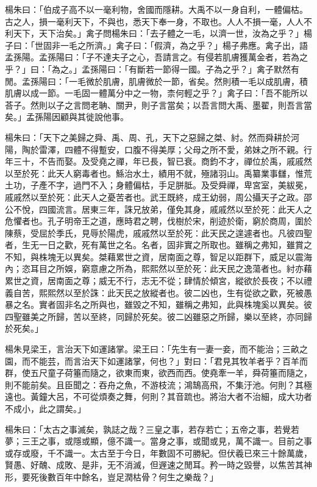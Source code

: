 \begin{pinyinscope}
楊朱曰：「伯成子高不以一毫利物，舍國而隱耕。大禹不以一身自利，一體偏枯。古之人，損一毫利天下，不與也，悉天下奉一身，不取也。人人不損一毫，人人不利天下，天下治矣。」禽子問楊朱曰：「去子體之一毛，以濟一世，汝為之乎？」楊子曰：「世固非一毛之所濟。」禽子曰：「假濟，為之乎？」楊子弗應。禽子出，語孟孫陽。孟孫陽曰：「子不達夫子之心，吾請言之。有侵若肌膚獲萬金者，若為之乎？」曰：「為之。」孟孫陽曰：「有斷若一節得一國。子為之乎？」禽子默然有閒。孟孫陽曰：「一毛微於肌膚，肌膚微於一節，省矣。然則積一毛以成肌膚，積肌膚以成一節。一毛固一體萬分中之一物，柰何輕之乎？」禽子曰：「吾不能所以荅子。然則以子之言問老聃、關尹，則子言當矣；以吾言問大禹、墨翟，則吾言當矣。」孟孫陽因顧與其徙說他事。

楊朱曰：「天下之美歸之舜、禹、周、孔，天下之惡歸之桀、紂。然而舜耕於河陽，陶於雷澤，四體不得蹔安，口腹不得美厚；父母之所不愛，弟妹之所不親。行年三十，不告而娶。及受堯之禪，年已長，智已衰。商鈞不才，禪位於禹，戚戚然以至於死：此天人窮毒者也。鯀治水土，績用不就，殛諸羽山。禹纂業事讎，惟荒土功，子產不字，過門不入；身體偏枯，手足胼胝。及受舜禪，卑宮室，美紱冕，戚戚然以至於死：此天人之憂苦者也。武王既終，成王幼弱，周公攝天子之政。邵公不悅，四國流言。居東三年，誅兄放弟，僅免其身，戚戚然以至於死：此天人之危懼者也。孔子明帝王之道，應時君之聘，伐樹於宋，削迹於衛，窮於商周，圍於陳蔡，受屈於季氏，見辱於陽虎，戚戚然以至於死：此天民之遑遽者也。凡彼四聖者，生无一日之歡，死有萬世之名。名者，固非實之所取也。雖稱之弗知，雖賞之不知，與株塊无以異矣。桀藉累世之資，居南面之尊，智足以距群下，威足以震海內；恣耳目之所娛，窮意慮之所為，熙熙然以至於死：此天民之逸蕩者也。紂亦藉累世之資，居南面之尊；威无不行，志无不從；肆情於傾宮，縱欲於長夜；不以禮義自苦，熙熙然以至於誅：此天民之放縱者也。彼二凶也，生有從欲之歡，死被愚暴之名。實者固非名之所與也，雖毀之不知，雖稱之弗知，此與株塊奚以異矣。彼四聖雖美之所歸，苦以至終，同歸於死矣。彼二凶雖惡之所歸，樂以至終，亦同歸於死矣。」

楊朱見梁王，言治天下如運諸掌。梁王曰：「先生有一妻一妾，而不能治；三畝之園，而不能芸，而言治天下如運諸掌，何也？」對曰：「君見其牧羊者乎？百羊而群，使五尺童子荷箠而隨之，欲東而東，欲西而西。使堯牽一羊，舜荷箠而隨之，則不能前矣。且臣聞之：吞舟之魚，不游枝流；鴻鵠高飛，不集汙池。何則？其極遠也。黃鐘大呂，不可從煩奏之舞，何則？其音䟽也。將治大者不治細，成大功者不成小，此之謂矣。」

楊朱曰：「太古之事滅矣，孰誌之哉？三皇之事，若存若亡；五帝之事，若覺若夢；三王之事，或隱或顯，億不識一。當身之事，或聞或見，萬不識一。目前之事或存或廢，千不識一。太古至于今日，年數固不可勝紀。但伏羲已來三十餘萬歲，賢愚、好醜、成敗、是非，无不消滅，但遟速之閒耳。矜一時之毀譽，以焦苦其神形，要死後數百年中餘名，豈足潤枯骨？何生之樂哉？」


\end{pinyinscope}
